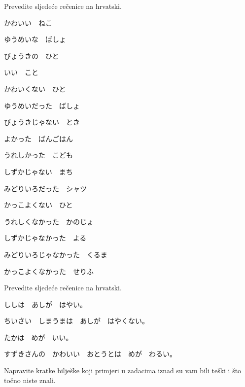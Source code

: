 
\author{autor}

	
	\begin{mondai}{Prevedite sljedeće rečenice na hrvatski.}
		\item かわいい　ねこ
		\item ゆうめいな　ばしょ
		\item びょうきの　ひと
		\item いい　こと
		
		\vspace{5pt}
		\item かわいくない　ひと
		\item ゆうめいだった　ばしょ
		\item びょうきじゃない　とき
		\item よかった　ばんごはん
		
		\vspace{5pt}
		\item うれしかった　こども
		\item しずかじゃない　まち
		\item みどりいろだった　シャツ
		\item かっこよくない　ひと
		
		\vspace{5pt}
		\item うれしくなかった　かのじょ
		\item しずかじゃなかった　よる
		\item みどりいろじゃなかった　くるま
		\item かっこよくなかった　せりふ
	\end{mondai}

	\begin{mondai}{Prevedite sljedeće rečenice na hrvatski.}
		\item ししは　あしが　はやい。
		\item ちいさい　しまうまは　あしが　はやくない。
		\item たかは　めが　いい。
		\item すずきさんの　かわいい　おとうとは　めが　わるい。
	\end{mondai}

	Napravite kratke bilješke koji primjeri u zadacima iznad su vam bili teški i što točno niste znali.
